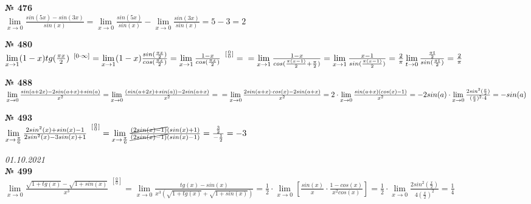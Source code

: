 \documentclass[12pt]{article}
\begin{document}
{\vspace{.5cm}
{
	{\textbf{№ 476} \vspace{.5cm}\\}
	\large{ $\lim\limits_{x \to 0} \frac{sin(5x)-sin(3x)}{sin(x)} = \lim\limits_{x \to 0}\frac{sin(5x)}{sin(x)} - \lim\limits_{x \to 0} \frac{sin(3x)}{sin(x)}=5-3=2$
	}
}

\vspace{.5cm}
{
	{\textbf{№ 480} \vspace{.5cm}\\}
	\large{ $\lim\limits_{x \to 1}(1-x)tg(\frac{\pi x}{2})^{\enspace [0 \cdot \infty]} =
		\lim\limits_{x \to 1} (1-x) \frac{sin(\frac{\pi x}{2})}{cos(\frac{\pi x}{2})} = \lim\limits_{x \to 1} \frac{1-x}{cos(\frac{\pi x}{2})}^{\enspace [\frac{0}{0}]}=\\ =\lim\limits_{x \to 1} \frac{1-x}{cos(\frac{\pi (x-1)}{2} + \frac{\pi}{2})} = \lim\limits_{x \to 1} \frac{x-1}{sin(\frac{\pi (x-1)}{2})}=\frac{2}{\pi} \lim\limits_{t \to 0} \frac{\frac{\pi t}{2}}{sin(\frac{\pi t}{2})} = \frac{2}{\pi}$
	}
}

\vspace{.5cm}
{
	{\textbf{№ 488} \vspace{.5cm}\\}
	\large{ $\lim\limits_{x \to 0} \frac{sin(a+2x)-2sin(a+x)+sin(a)}{x^2} = \lim\limits_{x \to 0} \frac{(sin(a+2x)+sin(a))-2sin(a+x)}{x^2} =\\= \lim\limits_{x \to 0} \frac{2sin(a+x)\cdot cos(x)-2sin(a+x)}{x^2} = 2 \cdot \lim\limits_{x \to 0} \frac{sin(a+x)(cos(x)-1)}{x^2}=-2sin(a) \cdot \lim\limits_{x \to 0} \frac{2sin^2(\frac{x}{2})}{(\frac{x}{2})^2 \cdot 4} = -sin(a)$
	}
}

\vspace{.5cm}
{
	{\textbf{№ 493} \vspace{.5cm}\\}
	\large{ $\lim\limits_{x \to \frac{\pi}{6}} \frac{2sin^2(x)+sin(x)-1}{2sin^2(x)-3sin(x)+1}^{\enspace [\frac{0}{0}]}=
		\lim\limits_{x \to \frac{\pi}{6}} \frac{\cancel{(2sin(x)-1)}(sin(x)+1)}{\cancel{(2sin(x)-1)}(sin(x)-1)}=\frac{\frac{3}{2}}{-\frac{1}{2}}=-3$
	}
}

\newpage
{\hfill \textit{01.10.2021}\\ \vspace{.2cm}}
{
	{\textbf{№ 499} \vspace{.5cm}\\}
	\large{ $\lim\limits_{x \to 0} \frac{\sqrt{1+tg(x)}-\sqrt{1+sin(x)}}{x^3}^{\enspace [\frac{0}{0}]} = \lim\limits_{x \to 0} \frac{tg(x)-sin(x)}{x^3(\sqrt{1+tg(x)}+\sqrt{1+sin(x)})} = \frac{1}{2} \cdot 
		\lim\limits_{x \to 0}[\frac{sin(x)}{x} \cdot \frac{1-cos(x)}{x^2cos(x)}] = \frac{1}{2} \cdot \lim\limits_{x \to 0} \frac{2sin^2(\frac{x}{2})}{4 (\frac{x}{2})^2} = \frac{1}{4}$
	}
}

}
\end{document}
